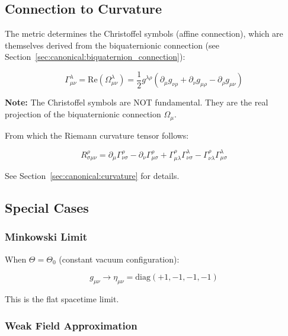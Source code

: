 \subsection{Connection to Curvature}

The metric determines the Christoffel symbols (affine connection), which are themselves derived from the biquaternionic connection (see Section~\ref{sec:canonical:biquaternion_connection}):

\begin{equation}
\label{eq:canonical:christoffel_from_metric}
\Gamma^\lambda_{\mu\nu} = \text{Re}(\Omega^\lambda_{\mu\nu}) = \frac{1}{2} g^{\lambda\rho} \left(\partial_\mu g_{\nu\rho} + \partial_\nu g_{\mu\rho} - \partial_\rho g_{\mu\nu}\right)
\end{equation}

\textbf{Note:} The Christoffel symbols are NOT fundamental. They are the real projection of the biquaternionic connection $\Omega_\mu$.

From which the Riemann curvature tensor follows:

\begin{equation}
\label{eq:canonical:riemann}
R^\rho_{\sigma\mu\nu} = \partial_\mu\Gamma^\rho_{\nu\sigma} - \partial_\nu\Gamma^\rho_{\mu\sigma} + \Gamma^\rho_{\mu\lambda}\Gamma^\lambda_{\nu\sigma} - \Gamma^\rho_{\nu\lambda}\Gamma^\lambda_{\mu\sigma}
\end{equation}

See Section~\ref{sec:canonical:curvature} for details.

\subsection{Special Cases}

\subsubsection{Minkowski Limit}

When $\Theta = \Theta_0$ (constant vacuum configuration):

\begin{equation}
\label{eq:canonical:minkowski_limit}
g_{\mu\nu} \to \eta_{\mu\nu} = \text{diag}(+1, -1, -1, -1)
\end{equation}

This is the flat spacetime limit.

\subsubsection{Weak Field Approximation}

